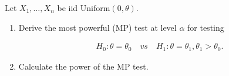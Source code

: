 
\begin{exercise}

Let $X_1, \dots, X_n$ be iid $\mathrm{Uniform}(0, \theta)$.

\begin{enumerate}[label = (\alph*)]

    \item Derive the most powerful (MP) test at level $\alpha$ for testing
    
    \begin{align*}
        H_0: \theta = \theta_0
        \quad
        \textit{vs}
        \quad
        H_1: \theta = \theta_1, \theta_1 > \theta_0.
    \end{align*}

    \item Calculate the power of the MP test.

\end{enumerate}

\end{exercise}


